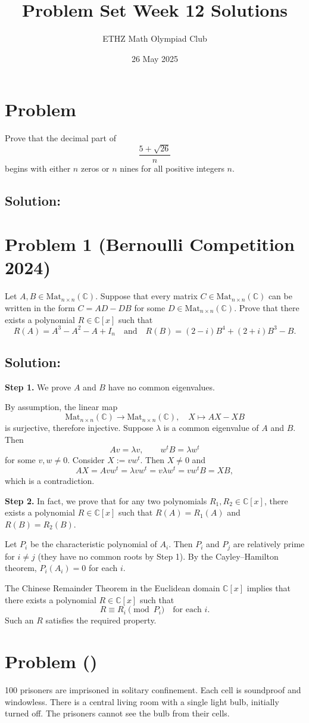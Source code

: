 \documentclass[11pt, a4paper, oneside]{article}
\title{Problem Set Week 12 Solutions}
\author{ETHZ Math Olympiad Club}
\date{26 May 2025}
\newcommand{\problem}[1][]{\section{#1} \hfill \par}
\newcommand{\solution}[1][]{\subsection*{#1}\hfill \par}
\theoremstyle{remark}
\theoremstyle{lemma}
\begin{document}
\maketitle
\problem[Problem ]
Prove that the decimal part of
\[
\frac{5 + \sqrt{26}}{n}
\]
begins with either $n$ zeros or $n$ nines for all positive integers $n$.

\solution[Solution:]

\newpage
\problem[Problem 1 (Bernoulli Competition 2024)]
Let \( A, B \in \mathrm{Mat}_{n \times n}(\mathbb{C}) \). Suppose that every matrix \( C \in \mathrm{Mat}_{n \times n}(\mathbb{C}) \) can be written in the form \( C = AD - DB \) for some \( D \in \mathrm{Mat}_{n \times n}(\mathbb{C}) \). Prove that there exists a polynomial \( R \in \mathbb{C}[x] \) such that
\[
R(A) = A^3 - A^2 - A + I_n \quad \text{and} \quad R(B) = (2 - i)B^4 + (2 + i)B^3 - B.
\]

\solution[Solution:]

\textbf{Step 1.} We prove \( A \) and \( B \) have no common eigenvalues.

By assumption, the linear map
\[
\mathrm{Mat}_{n \times n}(\mathbb{C}) \to \mathrm{Mat}_{n \times n}(\mathbb{C}), \quad X \mapsto AX - XB
\]
is surjective, therefore injective. Suppose \( \lambda \) is a common eigenvalue of \( A \) and \( B \). Then
\[
Av = \lambda v, \qquad w^t B = \lambda w^t
\]
for some \( v, w \neq 0 \). Consider \( X := v w^t \). Then \( X \neq 0 \) and
\[
AX = Av w^t = \lambda v w^t = v \lambda w^t = v w^t B = XB,
\]
which is a contradiction.

\textbf{Step 2.} In fact, we prove that for any two polynomials \( R_1, R_2 \in \mathbb{C}[x] \), there exists a polynomial \( R \in \mathbb{C}[x] \) such that \( R(A) = R_1(A) \) and \( R(B) = R_2(B) \).

Let \( P_i \) be the characteristic polynomial of \( A_i \). Then \( P_i \) and \( P_j \) are relatively prime for \( i \neq j \) (they have no common roots by Step 1). By the Cayley–Hamilton theorem, \( P_i(A_i) = 0 \) for each \( i \).

The Chinese Remainder Theorem in the Euclidean domain \( \mathbb{C}[x] \) implies that there exists a polynomial \( R \in \mathbb{C}[x] \) such that
\[
R \equiv R_i \pmod{P_i} \quad \text{for each } i.
\]
Such an \( R \) satisfies the required property.

\newpage
\problem[Problem ()]
100 prisoners are imprisoned in solitary confinement. Each cell is soundproof and windowless. There is a central living room with a single light bulb, initially turned off. The prisoners cannot see the bulb from their cells.
\end{document}
